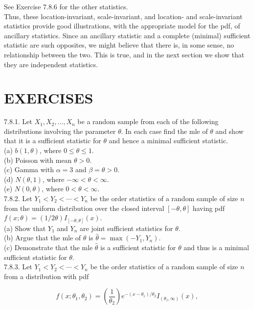 See Exercise 7.8.6 for the other statistics.\\
Thus, these location-invariant, scale-invariant, and location- and scale-invariant statistics provide good illustrations, with the appropriate model for the pdf, of ancillary statistics. Since an ancillary statistic and a complete (minimal) sufficient statistic are such opposites, we might believe that there is, in some sense, no relationship between the two. This is true, and in the next section we show that they are independent statistics.

\section*{EXERCISES}
7.8.1. Let $X_{1}, X_{2}, \ldots, X_{n}$ be a random sample from each of the following distributions involving the parameter $\theta$. In each case find the mle of $\theta$ and show that it is a sufficient statistic for $\theta$ and hence a minimal sufficient statistic.\\
(a) $b(1, \theta)$, where $0 \leq \theta \leq 1$.\\
(b) Poisson with mean $\theta>0$.\\
(c) Gamma with $\alpha=3$ and $\beta=\theta>0$.\\
(d) $N(\theta, 1)$, where $-\infty<\theta<\infty$.\\
(e) $N(0, \theta)$, where $0<\theta<\infty$.\\
7.8.2. Let $Y_{1}<Y_{2}<\cdots<Y_{n}$ be the order statistics of a random sample of size $n$ from the uniform distribution over the closed interval $[-\theta, \theta]$ having pdf $f(x ; \theta)=(1 / 2 \theta) I_{[-\theta, \theta]}(x)$.\\
(a) Show that $Y_{1}$ and $Y_{n}$ are joint sufficient statistics for $\theta$.\\
(b) Argue that the mle of $\theta$ is $\hat{\theta}=\max \left(-Y_{1}, Y_{n}\right)$.\\
(c) Demonstrate that the mle $\hat{\theta}$ is a sufficient statistic for $\theta$ and thus is a minimal sufficient statistic for $\theta$.\\
7.8.3. Let $Y_{1}<Y_{2}<\cdots<Y_{n}$ be the order statistics of a random sample of size $n$ from a distribution with pdf

$$
f\left(x ; \theta_{1}, \theta_{2}\right)=\left(\frac{1}{\theta_{2}}\right) e^{-\left(x-\theta_{1}\right) / \theta_{2}} I_{\left(\theta_{1}, \infty\right)}(x),
$$

